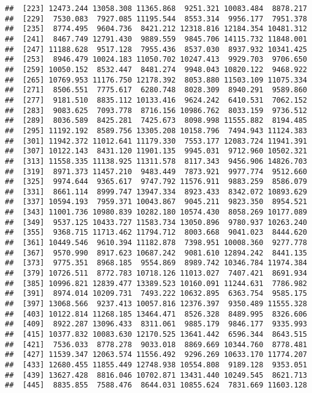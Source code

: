 \documentclass[]{article}
\begin{document}
\begin{verbatim}
##  [223] 12473.244 13058.308 11365.868  9251.321 10083.484  8878.217
##  [229]  7530.083  7927.085 11195.544  8553.314  9956.177  7951.378
##  [235]  8774.495  9604.736  8421.212 12318.816 12184.354 10481.312
##  [241]  8467.749 12791.430  9889.559  9845.706 14115.732 11848.001
##  [247] 11188.628  9517.128  7955.436  8537.030  8937.932 10341.425
##  [253]  8946.479 10024.183 11050.702 10247.413  9929.703  9706.650
##  [259] 10050.152  8532.447  8481.274  9948.043 10820.122  9468.922
##  [265] 10769.953 11176.750 12178.392  8053.880 11503.109 11075.334
##  [271]  8506.551  7775.617  6280.748  8028.309  8940.291  9589.860
##  [277]  9181.510  8835.112 10133.416  9624.242  6410.531  7062.152
##  [283]  9083.625  7093.778  8716.156 10986.762  8033.159  9736.512
##  [289]  8036.589  8425.281  7425.673  8098.998 11555.882  8194.485
##  [295] 11192.192  8589.756 13305.208 10158.796  7494.943 11124.383
##  [301] 11942.372 11012.641 11179.330  7553.177 12083.724 11941.391
##  [307] 10122.143  8431.120 11901.135  9945.031  9712.960 10502.321
##  [313] 11558.335 11138.925 11311.578  8117.343  9456.906 14826.703
##  [319]  8971.373 11457.210  9483.449  7873.921  9977.774  9512.660
##  [325]  9974.644  9365.617  9747.792 11576.911  9883.259  8586.079
##  [331]  8661.114  8999.747 13947.334  8923.433  8342.072 10893.629
##  [337] 10594.193  7959.371 10043.867  9045.211  9823.350  8954.521
##  [343] 11001.736 10980.839 10282.180 10574.430  8058.269 10177.089
##  [349]  9537.125 10433.727 11583.734 13050.896  9780.937 10263.240
##  [355]  9368.715 11713.462 11794.712  8003.668  9041.023  8444.620
##  [361] 10449.546  9610.394 11182.878  7398.951 10008.360  9277.778
##  [367]  9570.990  8917.623 10687.242  9081.610 12894.242  8441.135
##  [373]  9775.351  8968.185  9554.869  8989.742 10346.784 11974.384
##  [379] 10726.511  8772.783 10718.126 11013.027  7407.421  8691.934
##  [385] 10996.821 12839.477 13389.523 10160.091 11244.631  7786.982
##  [391]  8974.014 10209.731  7493.222 10632.895  6363.754  9585.175
##  [397] 13068.566  9237.413 10057.816 12376.397  9350.489 11555.328
##  [403] 10122.814 11268.185 13464.471  8526.328  8489.995  8326.606
##  [409]  8922.287 13096.433  8311.061  9885.179  9846.177  9335.993
##  [415] 10377.832 10083.630 12170.525 13641.442  6596.344  8643.515
##  [421]  7536.033  8778.278  9033.018  8869.669 10344.760  8778.481
##  [427] 11539.347 12063.574 11556.492  9296.269 10633.170 11774.207
##  [433] 12680.455 11855.449 12748.938 10554.808  9189.128  9353.051
##  [439] 13627.428  8816.046 10702.871 13431.440 10249.545  8621.713
##  [445]  8835.855  7588.476  8644.031 10855.624  7831.669 11603.128

\end{verbatim}
\end{document}
